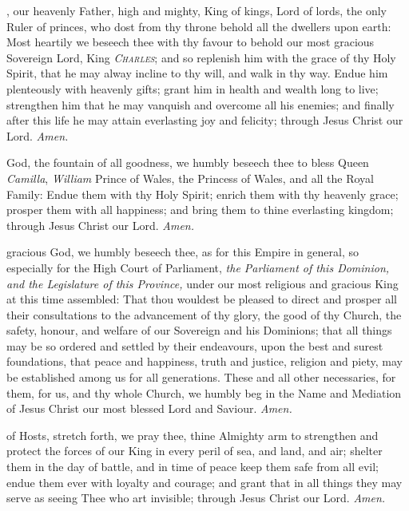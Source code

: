 , our heavenly Father, high and mighty, King of kings, Lord of lords, the only Ruler of princes, who dost from thy throne behold all the dwellers upon earth: Most heartily we beseech thee with thy favour to behold our most gracious Sovereign Lord, King \textsc{\textit{Charles}}; and so replenish him with the grace of thy Holy Spirit, that he may alway incline to thy will, and walk in thy way. Endue him plenteously with heavenly gifts; grant him in health and wealth long to live; strengthen him that he may vanquish and overcome all his enemies; and finally after this life he may attain everlasting joy and felicity; through Jesus Christ our Lord. \textit{Amen.}

 God, the fountain of all goodness, we humbly beseech thee to bless Queen \textit{Camilla}, \textit{William} Prince of Wales, the Princess of Wales, and all the Royal Family: Endue them with thy Holy Spirit; enrich them with thy heavenly grace; prosper them with all happiness; and bring them to thine everlasting kingdom; through Jesus Christ our Lord. \textit{Amen.}

 gracious God, we humbly beseech thee, as for this Empire in general, so especially for the High Court of Parliament, \textit{the Parliament of this Dominion, and the Legislature of this Province,} under our most religious and gracious King at this time assembled: That thou wouldest be pleased to direct and prosper all their consultations to the advancement of thy glory, the good of thy Church, the safety, honour, and welfare of our Sovereign and his Dominions; that all things may be so ordered and settled by their endeavours, upon the best and surest foundations, that peace and happiness, truth and justice, religion and piety, may be established among us for all generations. These and all other necessaries, for them, for us, and thy whole Church, we humbly beg in the Name and Mediation of Jesus Christ our most blessed Lord and Saviour. \textit{Amen.}

 of Hosts, stretch forth, we pray thee, thine Almighty arm to strengthen and protect the forces of our King in every peril of sea, and land, and air; shelter them in the day of battle, and in time of peace keep them safe from all evil; endue them ever with loyalty and courage; and grant that in all things they may serve as seeing Thee who art invisible; through Jesus Christ our Lord. \textit{Amen.}

